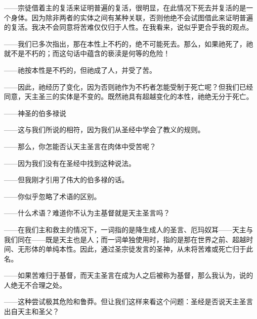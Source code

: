 ——宗徒借着主的复活来证明普遍的复活，很明显，在此情况下死去并复活的是一个身体。因为除非两者的实体之间有某种关联，否则他绝不会试图借此来证明普遍的复活。我决不会同意将苦难仅仅归于人性。在我看来，说似乎更合乎我的观点。\par

——我们已多次指出，那在本性上不朽的，绝不可能死去。那么，如果祂死了，祂就不是不朽的；而这句话中蕴含的亵渎是何等的危险！\par

——祂按本性是不朽的，但祂成了人，并受了苦。\par

——因此，祂经历了变化，因为否则祂作为不朽者怎能受制于死亡呢？但我们已经同意，天主圣三的实体是不变的。既然祂具有超越变化的本性，祂绝无分于死亡。\par

——神圣的伯多禄说\par

——这与我们所说的相符，因为我们从圣经中学会了教义的规则。\par

——那么，你怎能否认天主圣言在肉体中受苦呢？\par

——因为我们没有在圣经中找到这种说法。\par

——但我刚才引用了伟大的伯多禄的话。\par

——你似乎忽略了术语的区别。\par

——什么术语？难道你不认为主基督就是天主圣言吗？\par

——在我们主和救主的情况下，一词指的是降生成人的圣言、厄玛奴耳——天主与我们同在——既是天主也是人；而一词单独使用时，指的是那在世界之前、超越时间、无形体的单纯本性。因此，通过圣宗徒发言的圣神，从未将苦难或死亡归于此名。\par

——如果苦难归于基督，而天主圣言在成为人之后被称为基督，那么我认为，说的人绝无不合理之处。\par

——这种尝试极其危险和鲁莽。但让我们这样来看这个问题：圣经是否说天主圣言出自天主和圣父？\par

